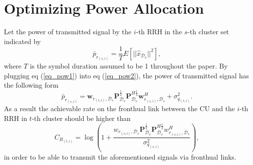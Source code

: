 \documentclass[conference,10pt,twocolumn,letter]{IEEEtran}
\begin{document}
\section{Optimizing Power Allocation}
Let the power of transmitted signal by the $i$-th RRH in the $s$-th cluster set indicated by
\begin{equation} \label{eq_pow2}
\bar{p}_{r_{(s,i)}} = \frac{1}{T} \mathit{E}[|| \hat{x}_{\mathcal{D}_v} ||^2] ,
\end{equation}
where $T$ is the symbol duration assumed to be 1 throughout the paper. By plugging eq (\ref{eq_pow1}) into eq (\ref{eq_pow2}), the power of transmitted signal has the following form
\begin{equation}
\bar{p}_{r_{(s,i)}} = \boldsymbol{w}_{r_{(s,i)},\mathcal{D}_{s}} \boldsymbol{P}_{\mathcal{D}_v}^{\frac{1}{2}} \boldsymbol{P}_{\mathcal{D}_v}^{H \frac{1}{2}}   \boldsymbol{w}_{r_{(s,i)},\mathcal{D}_{s}}^H + \sigma_{q_{(s,i)}}^2.
\end{equation}
As a result the achievable rate on the fronthual link between the CU and the $i$-th RRH in $t$-th cluster should be higher than
\begin{equation}
C_{R_{(t,i)}} = \log{(1+\frac{w_{r_{(s,i)},\mathcal{D}_{s}} \boldsymbol{P}_{\mathcal{D}_v}^{\frac{1}{2}} \boldsymbol{P}_{\mathcal{D}_v}^{H \frac{1}{2}}   w_{r_{(s,i)},\mathcal{D}_{s}}^H }{ \sigma_{q_{(s,i)}}^2})},
\end{equation}
in order to be able to transmit the aforementioned signals via fronthual links.
\end{document}
